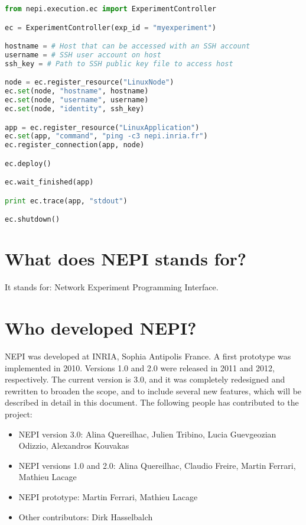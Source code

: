 \begin{lstlisting}[language=Python]
from nepi.execution.ec import ExperimentController

ec = ExperimentController(exp_id = "myexperiment")

hostname = # Host that can be accessed with an SSH account
username = # SSH user account on host
ssh_key = # Path to SSH public key file to access host

node = ec.register_resource("LinuxNode")
ec.set(node, "hostname", hostname)
ec.set(node, "username", username)
ec.set(node, "identity", ssh_key)

app = ec.register_resource("LinuxApplication")
ec.set(app, "command", "ping -c3 nepi.inria.fr")
ec.register_connection(app, node)

ec.deploy()

ec.wait_finished(app)

print ec.trace(app, "stdout")

ec.shutdown()

\end{lstlisting}

\section{What does NEPI stands for?}

It stands for: Network Experiment Programming Interface.

\section{Who developed NEPI?}

NEPI was developed at INRIA, Sophia Antipolis France.
A first prototype was implemented in 2010. 
Versions 1.0 and 2.0 were released in 2011 and 2012, respectively. 
The current version is 3.0, and it was completely redesigned and
rewritten to broaden the scope, and to include several  
new features, which will be described in detail in this document.
The following people has contributed to the project:

\begin{itemize}
  \item NEPI version 3.0: Alina Quereilhac, Julien Tribino, Lucia Guevgeozian Odizzio, Alexandros Kouvakas
  \item NEPI versions 1.0 and 2.0: Alina Quereilhac, Claudio Freire, Martin Ferrari, Mathieu Lacage
  \item NEPI prototype: Martin Ferrari, Mathieu Lacage
  \item Other contributors: Dirk Hasselbalch
\end{itemize}

